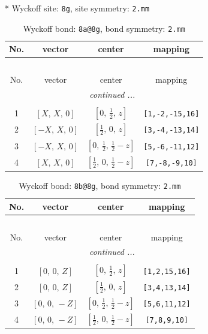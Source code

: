 \documentclass[fleqn,8pt]{jsarticle}
\begin{document}
* Wyckoff site: {\tt 8g}, site symmetry: {\tt 2.mm}
\renewcommand{\arraystretch}{1.2}
\begin{longtable}{cccc}
\caption{Wyckoff bond: {\tt 8a@8g}, bond symmetry: {\tt 2.mm}}
 \\
 \hline \hline
No. & vector & center & mapping \\ \hline \endfirsthead

\multicolumn{3}{l}{\tablename\ \thetable{}} \\
 \hline \hline
No. & vector & center & mapping \\ \hline \endhead

 \hline \hline
\multicolumn{3}{r}{\footnotesize\it continued ...} \\ \endfoot

 \hline \hline
\multicolumn{3}{r}{} \\ \endlastfoot

1 & $\left[ X,\, X,\, 0 \right]$ & $\left[ 0,\, \frac{1}{2},\, z \right]$ & {\tt [1,-2,-15,16]} \\ \hline
2 & $\left[ - X,\, X,\, 0 \right]$ & $\left[ \frac{1}{2},\, 0,\, z \right]$ & {\tt [3,-4,-13,14]} \\ \hline
3 & $\left[ - X,\, X,\, 0 \right]$ & $\left[ 0,\, \frac{1}{2},\, \frac{1}{2} - z \right]$ & {\tt [5,-6,-11,12]} \\ \hline
4 & $\left[ X,\, X,\, 0 \right]$ & $\left[ \frac{1}{2},\, 0,\, \frac{1}{2} - z \right]$ & {\tt [7,-8,-9,10]} \\
\end{longtable}
\renewcommand{\arraystretch}{1.2}
\begin{longtable}{cccc}
\caption{Wyckoff bond: {\tt 8b@8g}, bond symmetry: {\tt 2.mm}}
 \\
 \hline \hline
No. & vector & center & mapping \\ \hline \endfirsthead

\multicolumn{3}{l}{\tablename\ \thetable{}} \\
 \hline \hline
No. & vector & center & mapping \\ \hline \endhead

 \hline \hline
\multicolumn{3}{r}{\footnotesize\it continued ...} \\ \endfoot

 \hline \hline
\multicolumn{3}{r}{} \\ \endlastfoot

1 & $\left[ 0,\, 0,\, Z \right]$ & $\left[ 0,\, \frac{1}{2},\, z \right]$ & {\tt [1,2,15,16]} \\ \hline
2 & $\left[ 0,\, 0,\, Z \right]$ & $\left[ \frac{1}{2},\, 0,\, z \right]$ & {\tt [3,4,13,14]} \\ \hline
3 & $\left[ 0,\, 0,\, - Z \right]$ & $\left[ 0,\, \frac{1}{2},\, \frac{1}{2} - z \right]$ & {\tt [5,6,11,12]} \\ \hline
4 & $\left[ 0,\, 0,\, - Z \right]$ & $\left[ \frac{1}{2},\, 0,\, \frac{1}{2} - z \right]$ & {\tt [7,8,9,10]} \\
\end{longtable}
\end{document}

